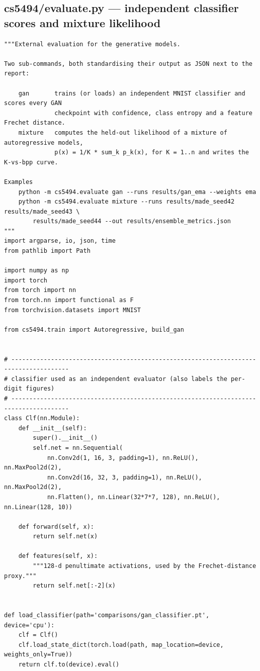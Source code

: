 \subsection*{cs5494/evaluate.py --- independent classifier scores and mixture likelihood}
\begin{lstlisting}
"""External evaluation for the generative models.

Two sub-commands, both standardising their output as JSON next to the report:

    gan       trains (or loads) an independent MNIST classifier and scores every GAN
              checkpoint with confidence, class entropy and a feature Frechet distance.
    mixture   computes the held-out likelihood of a mixture of autoregressive models,
              p(x) = 1/K * sum_k p_k(x), for K = 1..n and writes the K-vs-bpp curve.

Examples
    python -m cs5494.evaluate gan --runs results/gan_ema --weights ema
    python -m cs5494.evaluate mixture --runs results/made_seed42 results/made_seed43 \
        results/made_seed44 --out results/ensemble_metrics.json
"""
import argparse, io, json, time
from pathlib import Path

import numpy as np
import torch
from torch import nn
from torch.nn import functional as F
from torchvision.datasets import MNIST

from cs5494.train import Autoregressive, build_gan


# --------------------------------------------------------------------------------------
# classifier used as an independent evaluator (also labels the per-digit figures)
# --------------------------------------------------------------------------------------
class Clf(nn.Module):
    def __init__(self):
        super().__init__()
        self.net = nn.Sequential(
            nn.Conv2d(1, 16, 3, padding=1), nn.ReLU(), nn.MaxPool2d(2),
            nn.Conv2d(16, 32, 3, padding=1), nn.ReLU(), nn.MaxPool2d(2),
            nn.Flatten(), nn.Linear(32*7*7, 128), nn.ReLU(), nn.Linear(128, 10))

    def forward(self, x):
        return self.net(x)

    def features(self, x):
        """128-d penultimate activations, used by the Frechet-distance proxy."""
        return self.net[:-2](x)


def load_classifier(path='comparisons/gan_classifier.pt', device='cpu'):
    clf = Clf()
    clf.load_state_dict(torch.load(path, map_location=device, weights_only=True))
    return clf.to(device).eval()



\end{lstlisting}
